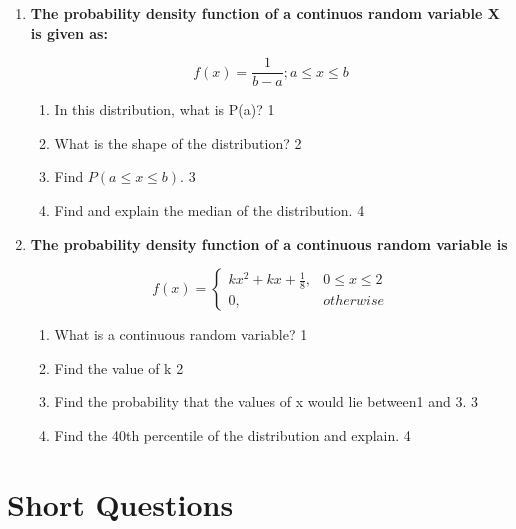 \documentclass[a4paper,oneside, margin=1.4in]{book}
\begin{document}
\begin{enumerate}
  \item
	  \textbf{The probability density function of a continuos random variable X is given as:}
	  
	  $$f(x) = \frac 1 {b-a}; a\le x\le b$$
  
  \begin{enumerate}
    \item
	In this distribution, what is P(a)? \hfill 1
    \item
    What is the shape of the distribution? \hfill 2	
    \item
	Find $P( a\le x\le b)$. \hfill 3
      \item
	Find and explain the median of the distribution. \hfill 4
  \end{enumerate}

 \item
  \textbf{The probability density function of a continuous random variable is}

$$
  f(x) =
\begin{cases}
kx^2+kx+ \frac 18,  & 0 \le x \le 2 \\
0, & otherwise
\end{cases}
$$

  \begin{enumerate}
    \item
	What is a continuous random variable? \hfill 1
    \item
    	Find the value of k \hfill 2
    \item
    	Find the probability that the values of x would lie between1 and 3. \hfill 3
     \item
     	Find the 40th percentile of the distribution and explain.  \hfill 4
  \end{enumerate}
  \end{enumerate}

\section{Short Questions}
\end{document}
